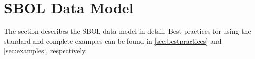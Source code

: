 
\section{SBOL Data Model}\label{sec:model}

The section describes the SBOL data model in detail.
Best practices for using the standard and complete examples can be found in \ref{sec:bestpractices} and \ref{sec:examples}, respectively.





















